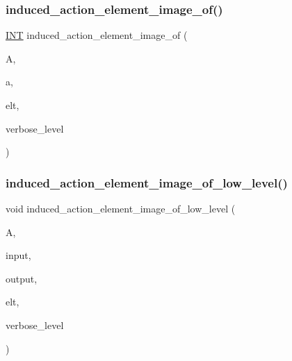 \mbox{\label{interface_8_c_a821850d6c3988dd122de0489cd36f0f0}} 
\subsubsection{\texorpdfstring{induced\+\_\+action\+\_\+element\+\_\+image\+\_\+of()}{induced\_action\_element\_image\_of()}}
{\footnotesize\ttfamily \mbox{\hyperlink{galois_8h_a09fddde158a3a20bd2dcadb609de11dc}{I\+NT}} induced\+\_\+action\+\_\+element\+\_\+image\+\_\+of (\begin{DoxyParamCaption}\item[{\mbox{\hyperlink{classaction}{action}} \&}]{A,  }\item[{\mbox{\hyperlink{galois_8h_a09fddde158a3a20bd2dcadb609de11dc}{I\+NT}}}]{a,  }\item[{void $\ast$}]{elt,  }\item[{\mbox{\hyperlink{galois_8h_a09fddde158a3a20bd2dcadb609de11dc}{I\+NT}}}]{verbose\+\_\+level }\end{DoxyParamCaption})}

\mbox{\label{interface_8_c_aa4bc5f68829829d9a41223c260c658c5}} 
\subsubsection{\texorpdfstring{induced\+\_\+action\+\_\+element\+\_\+image\+\_\+of\+\_\+low\+\_\+level()}{induced\_action\_element\_image\_of\_low\_level()}}
{\footnotesize\ttfamily void induced\+\_\+action\+\_\+element\+\_\+image\+\_\+of\+\_\+low\+\_\+level (\begin{DoxyParamCaption}\item[{\mbox{\hyperlink{classaction}{action}} \&}]{A,  }\item[{\mbox{\hyperlink{galois_8h_a09fddde158a3a20bd2dcadb609de11dc}{I\+NT}} $\ast$}]{input,  }\item[{\mbox{\hyperlink{galois_8h_a09fddde158a3a20bd2dcadb609de11dc}{I\+NT}} $\ast$}]{output,  }\item[{void $\ast$}]{elt,  }\item[{\mbox{\hyperlink{galois_8h_a09fddde158a3a20bd2dcadb609de11dc}{I\+NT}}}]{verbose\+\_\+level }\end{DoxyParamCaption})}

